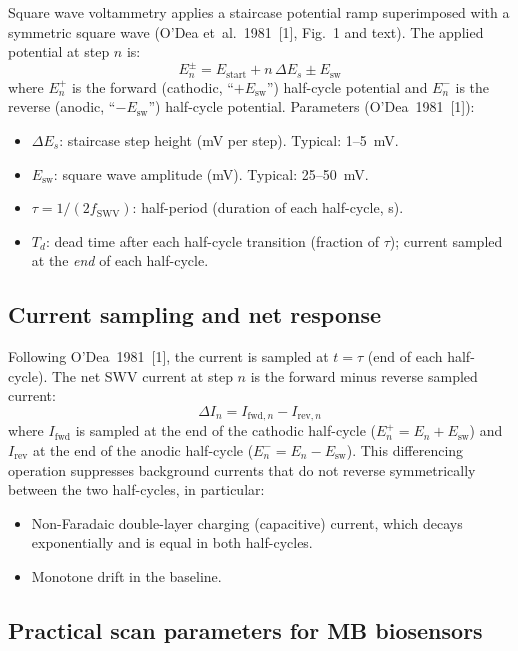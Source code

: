 \documentclass[10pt,a4paper]{article}
\numberwithin{equation}{section}
\newcommand{\cit}[1]{[#1]}
\newcommand{\DI}{\Delta I}
\newcommand{\Esw}{E_{\text{sw}}}
\newcommand{\Des}{\Delta E_s}
\begin{document}
Square wave voltammetry applies a staircase potential ramp superimposed
with a symmetric square wave (O'Dea et~al.\ 1981~\cit{1},
Fig.~1 and text). The applied potential at step $n$ is:
\begin{equation}
  E_n^{\pm} = E_{\text{start}} + n\,\Des \pm \Esw
  \label{eq:Enwaveform}
\end{equation}
where $E_n^+$ is the forward (cathodic, ``$+\Esw$'') half-cycle
potential and $E_n^-$ is the reverse (anodic, ``$-\Esw$'') half-cycle
potential. Parameters (O'Dea~1981~\cit{1}):
\begin{itemize}[nosep,leftmargin=*]
  \item $\Des$: staircase step height (mV per step). Typical: 1--5~mV.
  \item $\Esw$: square wave amplitude (mV). Typical: 25--50~mV.
  \item $\tau = 1/(2f_{\text{SWV}})$: half-period (duration of each half-cycle, s).
  \item $T_d$: dead time after each half-cycle transition (fraction of $\tau$);
    current sampled at the \textit{end} of each half-cycle.
\end{itemize}

\subsection{Current sampling and net response}

Following O'Dea~1981~\cit{1}, the current is sampled at $t = \tau$
(end of each half-cycle). The net SWV current at step $n$ is
the forward minus reverse sampled current:
\begin{equation}
  \DI_n = I_{\text{fwd},n} - I_{\text{rev},n}
  \label{eq:DIn}
\end{equation}
where $I_{\text{fwd}}$ is sampled at the end of the cathodic
half-cycle ($E_n^+ = E_n + \Esw$) and $I_{\text{rev}}$ at the end
of the anodic half-cycle ($E_n^- = E_n - \Esw$). This differencing
operation suppresses background currents that do not reverse
symmetrically between the two half-cycles, in particular:
\begin{itemize}[nosep]
  \item Non-Faradaic double-layer charging (capacitive) current,
    which decays exponentially and is equal in both half-cycles.
  \item Monotone drift in the baseline.
\end{itemize}

\subsection{Practical scan parameters for MB biosensors}
\end{document}
